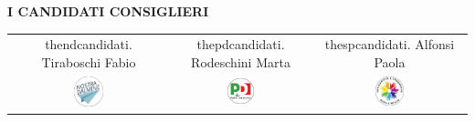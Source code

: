 \onecolumn
\thispagestyle{empty}
\begin{center}\chaptithuge\bfseries
  I CANDIDATI CONSIGLIERI
\end{center}
{}
\setcounter{ndcandidati}{0}
\setcounter{spcandidati}{0}
\setcounter{pdcandidati}{0}
\newcommand\candidato[3][. ]{%
  \stepcounter{#2}%
  \csname the#2\endcsname\relax#1\relax#3%
}
\newcommand\ndcandidato[1]{\candidato{ndcandidati}{#1}}
\newcommand\spcandidato[1]{\candidato{spcandidati}{#1}}
\newcommand\pdcandidato[1]{\candidato{pdcandidati}{#1}}
\begin{center}\Large
  \begin{tabular}{ccc}
    \ndcandidato{Tiraboschi Fabio}
    &
    \pdcandidato{Rodeschini Marta}
    &
    \spcandidato{Alfonsi Paola}
    \\
    \includegraphics[width=0.2\textwidth]{img/ndlogo}
    &
    \includegraphics[width=0.2\textwidth]{img/pdlogo}
    &
    \includegraphics[width=0.2\textwidth]{img/splogo}
  \end{tabular}
\end{center}
\twocolumn
